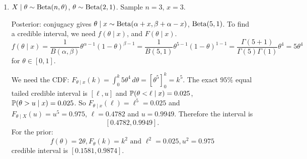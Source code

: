 \documentclass[10pt, a4paper]{article}
\begin{document}
\begin{problem}
    \begin{solution}\phantom{}
        \begin{enumerate}[label = 6.\arabic*]
            \item
            $X \mid \theta \sim \Beta(n, \theta)$,
            $\theta \sim \Beta(2, 1)$.
            Sample $n = 3$,
            $x = 3$.

            Posterior:
            conjugacy gives $\theta \mid x \sim \Beta(\alpha + x, \beta + \alpha - x)$,
            $\Beta(5, 1)$.
            To find a credible interval,
            we need $f(\theta \mid x)$,
            and $F(\theta \mid x)$.
            \[
            f(\theta \mid x) = \frac{1}{B(\alpha, \beta)}\theta ^ {\alpha - 1}(1 - \theta) ^ {\beta - 1} = \frac{1}{B(5, 1)}\theta ^ {5 - 1}(1 - \theta) ^ {1 - 1} = \frac{\Gamma(5 + 1)}{\Gamma(5)\Gamma(1)}\theta ^ 4 = 5\theta ^ 4
            \]
            for $\theta \in [0, 1]$.

            We need the CDF:
            $F_{\theta \mid x}(k) = \int_{0}^{k}5\theta ^ 4\,d\theta = \left[\theta ^ 5\right]_{0}^{k} = k ^ 5$.
            The exact $95\%$ equal tailed credible interval is $[\ell, u]$ and $\P(\theta < \ell \mid x) = 0.025$,
            $\P(\theta > u \mid x) = 0.025$.
            So $F_{\theta \mid x}(\ell) = \ell ^ 5 = 0.025$ and $F_{\theta \mid X}(u) = u ^ 5 = 0.975$,
            $\ell = 0.4782$ and $u = 0.9949$.
            Therefore the interval is
            \[
            [0.4782, 0.9949].
            \]
            For the prior:
            \[
            f(\theta) = 2\theta, F_{\theta}(k) = k ^ 2\text{ and } \ell ^ 2 = 0.025, u ^ 2 = 0.975
            \]
            credible interval is $[0.1581, 0.9874]$.


\end{enumerate}
\end{solution}
\end{problem}
\end{document}
